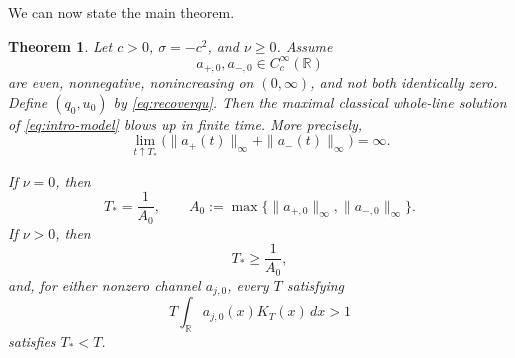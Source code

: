 \documentclass[11pt]{article}
\newtheorem{theorem}{Theorem}[section]
\theoremstyle{definition}
\newcommand{\R}{\mathbb R}
\begin{document}
We can now state the main theorem.

\begin{theorem}\label{thm:main}
Let $c>0$, $\sigma=-c^2$, and $\nu\ge0$.  Assume
\[
 a_{+,0},a_{-,0}\in C_c^\infty(\R)
\]
are even, nonnegative, nonincreasing on $(0,\infty)$, and not both identically zero.  Define $(q_0,u_0)$ by \eqref{eq:recoverqu}.  Then the maximal classical whole-line solution of \eqref{eq:intro-model} blows up in finite time.  More precisely,
\begin{equation}\label{eq:amplitude-blowup}
 \lim_{t\uparrow T_*}
 \bigl(\|a_+(t)\|_\infty+\|a_-(t)\|_\infty\bigr)=\infty.
\end{equation}

If $\nu=0$, then
\begin{equation}\label{eq:exactT}
 T_*=\frac1{A_0},
 \qquad
 A_0:=\max\{\|a_{+,0}\|_\infty,\|a_{-,0}\|_\infty\}.
\end{equation}
If $\nu>0$, then
\begin{equation}\label{eq:lowerlife}
 T_*\ge\frac1{A_0},
\end{equation}
and, for either nonzero channel $a_{j,0}$, every $T$ satisfying
\begin{equation}\label{eq:upperlife}
 T\int_\R a_{j,0}(x)K_T(x)\,dx>1
\end{equation}
satisfies $T_*<T$.
\end{theorem}
\end{document}
